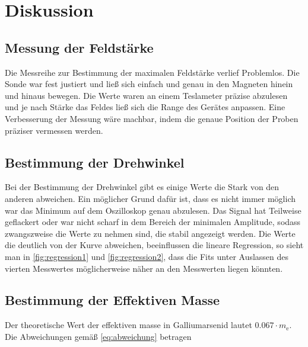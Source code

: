 \section{Diskussion}
\label{sec:Diskussion}

\subsection{Messung der Feldstärke}
Die Messreihe zur Bestimmung der maximalen Feldstärke verlief Problemlos. Die Sonde war fest 
justiert und ließ sich einfach und genau in den Magneten hinein und hinaus bewegen. Die Werte waren 
an einem Teslameter präzise abzulesen und je nach Stärke das Feldes ließ sich die Range des 
Gerätes anpassen. Eine Verbesserung der Messung wäre machbar, indem die genaue Position der Proben präziser vermessen werden.

\subsection{Bestimmung der Drehwinkel}
Bei der Bestimmung der Drehwinkel gibt es einige Werte die Stark von den anderen abweichen. Ein möglicher 
Grund dafür ist, dass es nicht immer möglich war das Minimum auf dem Oszilloskop genau abzulesen. Das Signal 
hat Teilweise geflackert oder war nicht scharf in dem Bereich der minimalen Amplitude, sodass zwangszweise die Werte 
zu nehmen sind, die stabil angezeigt werden. Die Werte die deutlich von der Kurve abweichen, beeinflussen die lineare Regression,
so sieht man in \autoref{fig:regression1} und \autoref{fig:regression2}, dass die Fits unter Auslassen des vierten Messwertes möglicherweise näher an den Messwerten
liegen könnten.

\subsection{Bestimmung der Effektiven Masse}
Der theoretische Wert der effektiven masse in Galliumarsenid lautet $\num{0.067} \cdot m_\text{e}$. Die Abweichungen gemäß \autoref{eq:abweichung} betragen

